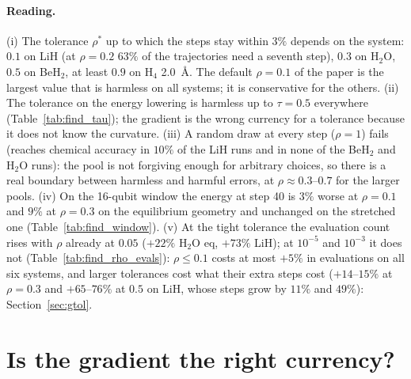 \documentclass[11pt]{article}
\begin{document}
\paragraph{Reading.} (i) The tolerance $\rho^\ast$ up to which the steps stay within $3\%$ depends on the system: $0.1$ on LiH (at $\rho=0.2$ $63\%$ of the trajectories need a seventh step), $0.3$ on H$_2$O, $0.5$ on BeH$_2$, at least $0.9$ on H$_4$ 2.0~\AA. The default $\rho=0.1$ of the paper is the largest value that is harmless on all systems; it is conservative for the others.
(ii) The tolerance on the energy lowering is harmless up to $\tau=0.5$ everywhere (Table~\ref{tab:find_tau}); the gradient is the wrong currency for a tolerance because it does not know the curvature. (iii) A random draw at every step ($\rho=1$) fails (reaches chemical accuracy in $10\%$ of the LiH runs and in none of the BeH$_2$ and H$_2$O runs): the pool is not forgiving enough for arbitrary choices,
so there is a real boundary between harmless and harmful errors, at $\rho\approx0.3$--$0.7$ for the larger pools. (iv) On the 16-qubit window the energy at step 40 is $3\%$ worse at $\rho=0.1$ and $9\%$ at $\rho=0.3$ on the equilibrium geometry and unchanged on the stretched one (Table~\ref{tab:find_window}).
(v) At the tight tolerance the evaluation count rises with $\rho$ already at $0.05$ ($+22\%$ H$_2$O eq, $+73\%$ LiH); at $10^{-5}$ and $10^{-3}$ it does not (Table~\ref{tab:find_rho_evals}): $\rho\le0.1$ costs at most $+5\%$ in evaluations on all six systems, and larger tolerances cost what their extra steps cost ($+14$--$15\%$ at $\rho=0.3$ and $+65$--$76\%$ at $0.5$ on LiH, whose steps grow by $11\%$ and $49\%$): Section~\ref{sec:gtol}.

\section{Is the gradient the right currency?}\label{sec:greedy}
\end{document}
